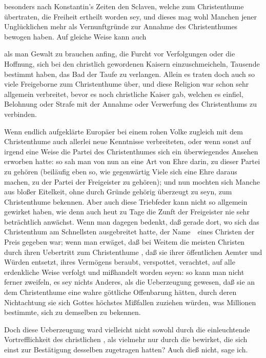 \begin{aufza}
\begin{aufzb}
\item besonders nach Konstantin's Zeiten den Sclaven, welche zum Christenthume übertraten, die Freiheit ertheilt worden sey, und dieses mag wohl Manchen jener Unglücklichen mehr als Vernunftgründe zur Annahme des Christenthumes bewogen haben. Auf gleiche Weise kann auch
\item als man Gewalt zu brauchen anfing, die Furcht vor Verfolgungen oder die Hoffnung, sich bei den christlich gewordenen Kaisern einzuschmeicheln, Tausende bestimmt haben, das Bad der Taufe zu verlangen. Allein es traten doch auch so viele Freigeborne zum Christenthume über, und diese Religion war schon sehr allgemein verbreitet, bevor es noch christliche Kaiser gab, welchen es einfiel, Belohnung oder Strafe mit der Annahme oder Verwerfung des Christenthums zu verbinden.
\item Wenn endlich aufgeklärte Europäer bei einem rohen Volke zugleich mit dem Christenthume auch allerlei neue Kenntnisse verbreiteten, oder wenn sonst auf irgend eine Weise die Partei des Christenthumes sich ein überwiegendes Ansehen erworben hatte: so sah man von nun an eine Art von Ehre darin, zu dieser Partei zu gehören (beiläufig eben so, wie gegenwärtig Viele sich eine Ehre daraus machen, zu der Partei der Freigeister zu gehören); und nun mochten sich Manche aus bloßer Eitelkeit, ohne durch Gründe gehörig überzeugt zu seyn, zum Christenthume bekennen. Aber auch diese Triebfeder kann nicht so allgemein gewirket haben, wie denn auch heut zu Tage die Zunft der Freigeister nie sehr beträchtlich anwächst. Wenn man dagegen bedenkt, daß gerade dort, wo sich das Christenthum am Schnellsten ausgebreitet hatte, der Name~\ eines Christen der  Preis gegeben war; wenn man erwäget, daß bei Weitem die meisten Christen durch ihren Uebertritt zum Christenthume , daß sie ihrer öffentlichen Aemter und Würden entsetzt, ihres Vermögens beraubt, verspottet, verachtet, auf alle erdenkliche Weise verfolgt und mißhandelt worden seyen: so kann man nicht ferner zweifeln, es sey nichts Anderes, als die Ueberzeugung gewesen, daß sie an dem Christenthume eine wahre göttliche Offenbarung hätten, durch deren Nichtachtung sie sich Gottes höchstes Mißfallen zuziehen würden, was Millionen bestimmte, sich zu demselben zu bekennen.
\end{aufzb}
\item Doch diese Ueberzeugung ward vielleicht nicht sowohl durch die einleuchtende Vortrefflichkeit des christlichen , als vielmehr nur durch die  bewirket, die sich einst zur Bestätigung desselben zugetragen hatten? Auch dieß nicht, sage ich.\par

\end{aufza}
